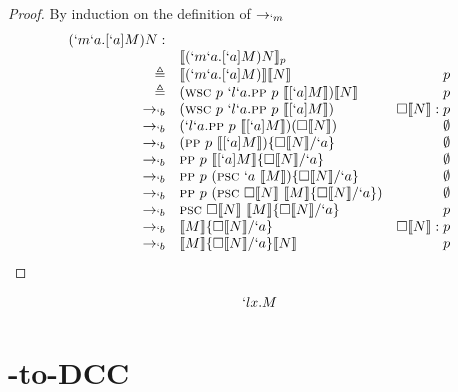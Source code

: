 \begin{proof}{By induction on the definition of $\rightarrow_{`m}$}
\[\begin{array}{rlrr}
  (`m`a.[`a]M) N: \\
  & \llbracket (`m`a.[`a]M) N \rrbracket_{p} \\
  \triangleq & \llbracket (`m`a.[`a]M) \rrbracket \llbracket N \rrbracket & p \\
  \triangleq & (\textsc{wsc}\ p\ `l`a.\textsc{pp}\ p\ \llbracket [`a]M \rrbracket) \llbracket N \rrbracket & p \\
  \rightarrow_{`b} & (\textsc{wsc}\ p\ `l`a.\textsc{pp}\ p\ \llbracket [`a]M \rrbracket) & \square\llbracket N \rrbracket:p \\
  \rightarrow_{`b} & (`l`a.\textsc{pp}\ p\ \llbracket [`a]M \rrbracket)(\square\llbracket N \rrbracket) & \emptyset \\
  \rightarrow_{`b} & (\textsc{pp}\ p\ \llbracket [`a]M \rrbracket)\{\square\llbracket N \rrbracket/`a\} & \emptyset \\
  \rightarrow_{`b} & \textsc{pp}\ p\ \llbracket [`a]M \rrbracket\{\square\llbracket N \rrbracket/`a\} & \emptyset \\
  \rightarrow_{`b} & \textsc{pp}\ p\ (\textsc{psc}\ `a\ \llbracket M \rrbracket)\{\square\llbracket N \rrbracket/`a\} & \emptyset \\
  \rightarrow_{`b} & \textsc{pp}\ p\ (\textsc{psc}\ \square\llbracket N \rrbracket\ \llbracket M \rrbracket\{\square\llbracket N \rrbracket/`a\}) & \emptyset \\
  \rightarrow_{`b} & \textsc{psc}\ \square\llbracket N \rrbracket\ \llbracket M \rrbracket\{\square\llbracket N \rrbracket/`a\} & p \\
  \rightarrow_{`b} & \llbracket M \rrbracket\{\square\llbracket N \rrbracket/`a\} & \square\llbracket N \rrbracket:p \\
  \rightarrow_{`b} & \llbracket M \rrbracket\{\square\llbracket N \rrbracket/`a\}\llbracket N \rrbracket & p \\

\end{array}
\]
\end{proof}

\begin{figure}[!h]
\[
\begin{array}{lll}
  `lx.M
\end{array}
\]
\end{figure}

\section{\ltry-to-DCC}
